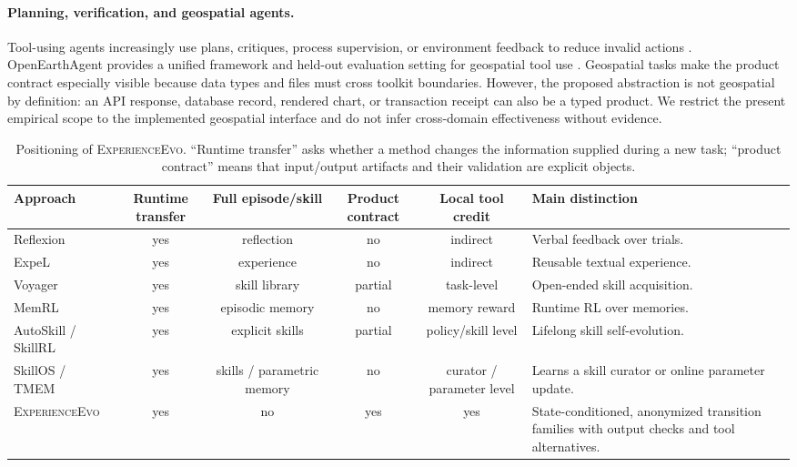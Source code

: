 \documentclass[10pt]{article}
\newcommand{\method}{\textsc{ExperienceEvo}}
\begin{document}
\paragraph{Planning, verification, and geospatial agents.} Tool-using agents increasingly use plans, critiques, process supervision, or environment feedback to reduce invalid actions \cite{reflexion,toolformer,toolrl}. OpenEarthAgent provides a unified framework and held-out evaluation setting for geospatial tool use \cite{openearthagent}. Geospatial tasks make the product contract especially visible because data types and files must cross toolkit boundaries. However, the proposed abstraction is not geospatial by definition: an API response, database record, rendered chart, or transaction receipt can also be a typed product. We restrict the present empirical scope to the implemented geospatial interface and do not infer cross-domain effectiveness without evidence.

\begin{table}[t]
\centering
\caption{Positioning of \method{}. ``Runtime transfer'' asks whether a method changes the information supplied during a new task; ``product contract'' means that input/output artifacts and their validation are explicit objects.}
\label{tab:positioning}
\small
\begin{tabular}{p{2.4cm}ccccp{5.2cm}}
\toprule
Approach & Runtime transfer & Full episode/skill & Product contract & Local tool credit & Main distinction \\
\midrule
Reflexion \cite{reflexion} & yes & reflection & no & indirect & Verbal feedback over trials. \\
ExpeL \cite{expel} & yes & experience & no & indirect & Reusable textual experience. \\
Voyager \cite{voyager} & yes & skill library & partial & task-level & Open-ended skill acquisition. \\
MemRL \cite{memrl} & yes & episodic memory & no & memory reward & Runtime RL over memories. \\
AutoSkill / SkillRL \cite{autoskill,skillrl} & yes & explicit skills & partial & policy/skill level & Lifelong skill self-evolution. \\
SkillOS / TMEM \cite{skillos,tmem} & yes & skills / parametric memory & no & curator / parameter level & Learns a skill curator or online parameter update. \\
\method{} & yes & no & yes & yes & State-conditioned, anonymized transition families with output checks and tool alternatives. \\
\bottomrule
\end{tabular}
\end{table}
\end{document}
